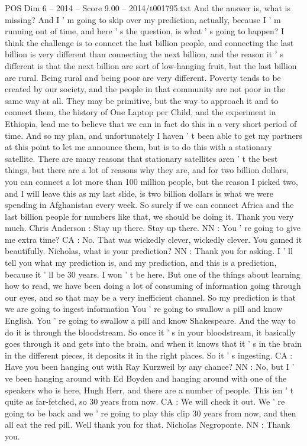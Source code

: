 \begin{textsample}{POS Dim 6 – 2014 – Score 9.00 – 2014/t001795.txt}
And the answer is, what is missing?
And I ' m going to skip over my prediction, actually, because I ' m running out of time, and here ' s the question, is what ' s going to happen?
I think the challenge is to connect the last billion people, and connecting the last billion is very different than connecting the next billion, and the reason it ' s different is that the next billion are sort of low-hanging fruit, but the last billion are rural.
Being rural and being poor are very different.
Poverty tends to be created by our society, and the people in that community are not poor in the same way at all.
They may be primitive, but the way to approach it and to connect them, the history of One Laptop per Child, and the experiment in Ethiopia, lead me to believe that we can in fact do this in a very short period of time.
And so my plan, and unfortunately I haven ' t been able to get my partners at this point to let me announce them, but is to do this with a stationary satellite.
There are many reasons that stationary satellites aren ' t the best things, but there are a lot of reasons why they are, and for two billion dollars, you can connect a lot more than 100 million people, but the reason I picked two, and I will leave this as my last slide, is two billion dollars is what we were spending in Afghanistan every week.
So surely if we can connect Africa and the last billion people for numbers like that, we should be doing it.
Thank you very much.
Chris Anderson : Stay up there.
Stay up there.
NN : You ' re going to give me extra time?
CA : No.
That was wickedly clever, wickedly clever.
You gamed it beautifully.
Nicholas, what is your prediction?
NN : Thank you for asking.
I ' ll tell you what my prediction is, and my prediction, and this is a prediction, because it ' ll be 30 years.
I won ' t be here.
But one of the things about learning how to read, we have been doing a lot of consuming of information going through our eyes, and so that may be a very inefficient channel.
So my prediction is that we are going to ingest information You ' re going to swallow a pill and know English.
You ' re going to swallow a pill and know Shakespeare.
And the way to do it is through the bloodstream.
So once it ' s in your bloodstream, it basically goes through it and gets into the brain, and when it knows that it ' s in the brain in the different pieces, it deposits it in the right places.
So it ' s ingesting.
CA : Have you been hanging out with Ray Kurzweil by any chance?
NN : No, but I ' ve been hanging around with Ed Boyden and hanging around with one of the speakers who is here, Hugh Herr, and there are a number of people.
This isn ' t quite as far-fetched, so 30 years from now.
CA : We will check it out.
We ' re going to be back and we ' re going to play this clip 30 years from now, and then all eat the red pill.
Well thank you for that.
Nicholas Negroponte.
NN : Thank you.

\end{textsample}
